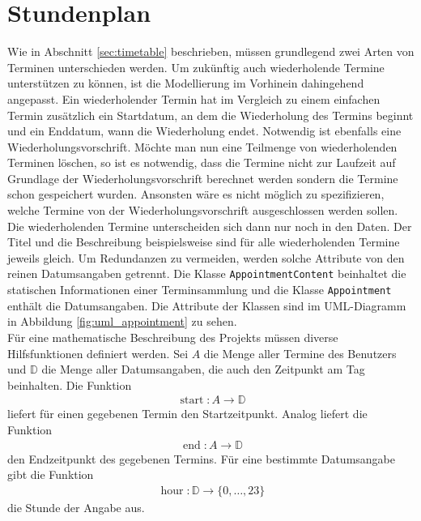 \documentclass[noindent]{tudreport}
\DeclareMathOperator{\start}{start}
\DeclareMathOperator{\getEnd}{end}
\DeclareMathOperator{\hour}{hour}
\begin{document}
		\section{Stundenplan}\label{sec:impl_timetable}
			Wie in Abschnitt \ref{sec:timetable} beschrieben, müssen grundlegend zwei Arten von Terminen unterschieden werden. Um zukünftig auch wiederholende Termine unterstützen zu können, ist die Modellierung im Vorhinein dahingehend angepasst. Ein wiederholender Termin hat im Vergleich zu einem einfachen Termin zusätzlich ein Startdatum, an dem die Wiederholung des Termins beginnt und ein Enddatum, wann die Wiederholung endet. Notwendig ist ebenfalls eine Wiederholungsvorschrift. Möchte man nun eine Teilmenge von wiederholenden Terminen löschen, so ist es notwendig, dass die Termine nicht zur Laufzeit auf Grundlage der Wiederholungsvorschrift berechnet werden sondern die Termine schon gespeichert wurden. Ansonsten wäre es nicht möglich zu spezifizieren, welche Termine von der Wiederholungsvorschrift ausgeschlossen werden sollen. Die wiederholenden Termine unterscheiden sich dann nur noch in den Daten. Der Titel und die Beschreibung beispielsweise sind für alle wiederholenden Termine jeweils gleich. Um Redundanzen zu vermeiden, werden solche Attribute von den reinen Datumsangaben getrennt. Die Klasse \lstinline!AppointmentContent! beinhaltet die statischen Informationen einer Terminsammlung und die Klasse \lstinline!Appointment! enthält die Datumsangaben. Die Attribute der Klassen sind im UML-Diagramm in Abbildung \ref{fig:uml_appointment} zu sehen.\\
			Für eine mathematische Beschreibung des Projekts müssen diverse Hilfsfunktionen definiert werden. Sei $A$ die Menge aller Termine des Benutzers und $\mathbb{D}$ die Menge aller Datumsangaben, die auch den Zeitpunkt am Tag beinhalten. Die Funktion
			\begin{align}
\start: A \rightarrow \mathbb{D} \label{fun:start}
			\end{align}
			liefert für einen gegebenen Termin den Startzeitpunkt. Analog liefert die Funktion
			\begin{align}
\getEnd: A \rightarrow \mathbb{D} \label{fun:end}
			\end{align}
			den Endzeitpunkt des gegebenen Termins. Für eine bestimmte Datumsangabe gibt die Funktion
			\begin{align}
\hour: \mathbb{D} \rightarrow \{0, \dots, 23\} \label{fun:hour}
			\end{align}
			die Stunde der Angabe aus.
			
\end{document}
